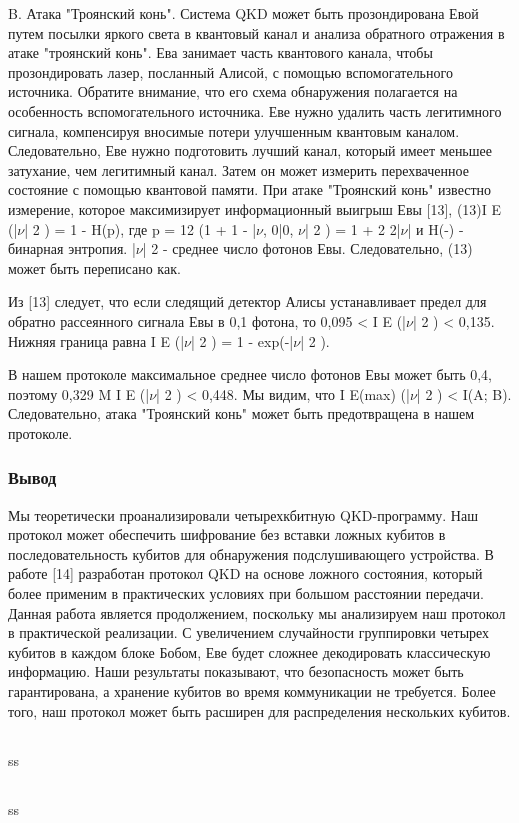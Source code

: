 B. Атака "Троянский конь". Система QKD может быть прозондирована Евой путем посылки яркого света в квантовый канал и анализа обратного отражения в атаке "троянский конь". Ева занимает часть квантового канала, чтобы прозондировать лазер, посланный Алисой, с помощью вспомогательного источника. Обратите внимание, что его схема обнаружения полагается на особенность вспомогательного источника. Еве нужно удалить часть легитимного сигнала, компенсируя вносимые потери улучшенным квантовым каналом. Следовательно, Еве нужно подготовить лучший канал, который имеет меньшее затухание, чем легитимный канал. Затем он может измерить перехваченное состояние с помощью квантовой памяти.
При атаке "Троянский конь" известно измерение, которое максимизирует информационный выигрыш Евы [13], (13)I E (|$\nu$| 2 ) = 1 - H(p), где p = 12 (1 + 1 - |$\nu$, 0|0, $\nu$| 2 ) = 1 + 2 2|$\nu$| и H(-) - бинарная энтропия. |$\nu$| 2 - среднее число фотонов Евы. Следовательно, (13) может быть переписано как.

Из [13] следует, что если следящий детектор Алисы устанавливает предел для обратно рассеянного сигнала Евы в 0,1 фотона, то 0,095 < I E (|$\nu$| 2 ) < 0,135. Нижняя граница равна I E (|$\nu$| 2 ) = 1 - exp(-|$\nu$| 2 ).

В нашем протоколе максимальное среднее число фотонов Евы может быть 0,4, поэтому 0,329 M I E (|$\nu$| 2 ) < 0,448. Мы видим, что I E(max) (|$\nu$| 2 ) < I(A; B). Следовательно, атака "Троянский конь" может быть предотвращена в нашем протоколе.

\subsubsection{Вывод}
Мы теоретически проанализировали четырехкбитную QKD-программу. Наш протокол может обеспечить шифрование без вставки ложных кубитов в последовательность кубитов для обнаружения подслушивающего устройства. В работе [14] разработан протокол QKD на основе ложного состояния, который более применим в практических условиях при большом расстоянии передачи. Данная работа является продолжением, поскольку мы анализируем наш протокол в практической реализации. С увеличением случайности группировки четырех кубитов в каждом блоке Бобом, Еве будет сложнее декодировать классическую информацию. Наши результаты показывают, что безопасность может быть гарантирована, а хранение кубитов во время коммуникации не требуется. Более того, наш протокол может быть расширен для распределения нескольких кубитов.


\subsection{\review}
ss
\subsection{\dic}
ss